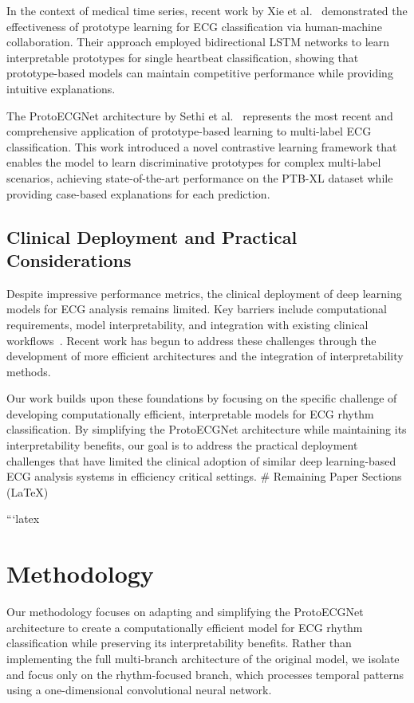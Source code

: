 In the context of medical time series, recent work by Xie et al.~\cite{xie2024prototype} demonstrated the effectiveness of prototype learning for ECG classification via human-machine collaboration. Their approach employed bidirectional LSTM networks to learn interpretable prototypes for single heartbeat classification, showing that prototype-based models can maintain competitive performance while providing intuitive explanations.

The ProtoECGNet architecture by Sethi et al.~\cite{sethi2025protoecgnet} represents the most recent and comprehensive application of prototype-based learning to multi-label ECG classification. This work introduced a novel contrastive learning framework that enables the model to learn discriminative prototypes for complex multi-label scenarios, achieving state-of-the-art performance on the PTB-XL dataset while providing case-based explanations for each prediction.

\subsection{Clinical Deployment and Practical Considerations}

Despite impressive performance metrics, the clinical deployment of deep learning models for ECG analysis remains limited. Key barriers include computational requirements, model interpretability, and integration with existing clinical workflows~\cite{martinezselles2023current}. Recent work has begun to address these challenges through the development of more efficient architectures and the integration of interpretability methods.

Our work builds upon these foundations by focusing on the specific challenge of developing computationally efficient, interpretable models for ECG rhythm classification. By simplifying the ProtoECGNet architecture while maintaining its interpretability benefits, our goal is to address the practical deployment challenges that have limited the clinical adoption of similar deep learning-based ECG analysis systems in efficiency critical settings.
# Remaining Paper Sections (LaTeX)

```latex
\section{Methodology}

Our methodology focuses on adapting and simplifying the ProtoECGNet architecture to create a computationally efficient model for ECG rhythm classification while preserving its interpretability benefits. Rather than implementing the full multi-branch architecture of the original model, we isolate and focus only on the rhythm-focused branch, which processes temporal patterns using a one-dimensional convolutional neural network.

